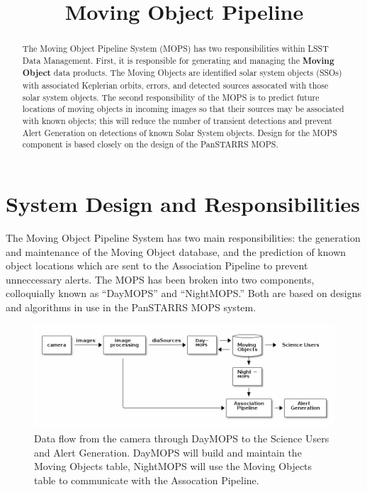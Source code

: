 \documentclass[12pt,preprint]{aastex}
\begin{document}
\title{Moving Object Pipeline}

\author{}

\begin{abstract}

The Moving Object Pipeline System (MOPS) has two responsibilities
within LSST Data Management.  First, it is responsible for generating
and managing the \textbf{Moving Object} data products.  The Moving
Objects are identified solar system objects (SSOs) with associated
Keplerian orbits, errors, and detected sources assocated with those
solar system objects.  The second responsibility of the MOPS is to
predict future locations of moving objects in incoming images so that
their sources may be associated with known objects; this will reduce
the number of transient detections and prevent Alert Generation on
detections of known Solar System objects.  Design for the MOPS
component is based closely on the design of the PanSTARRS MOPS.

\end{abstract}

\tableofcontents


\section{System Design and Responsibilities}

The Moving Object Pipeline System has two main responsibilities: the
generation and maintenance of the Moving Object database, and the
prediction of known object locations which are sent to the Association
Pipeline to prevent unneccessary alerts.  The MOPS has been broken
into two components, colloquially known as ``DayMOPS'' and ``NightMOPS.''
Both are based on designs and algorithms in use in the PanSTARRS MOPS
system.
 

\begin{figure}[!ht]
\centering
  \includegraphics[width=13cm]{illustrations/mopsWithinLsst.png}
\caption{ Data flow from the camera through DayMOPS to the Science
  Users and Alert Generation.  DayMOPS will build and maintain the
  Moving Objects table, NightMOPS will use the Moving Objects table to
  communicate with the Assocation Pipeline.  }
\label{mopsWithinLsst}
\end{figure}
\end{document}
